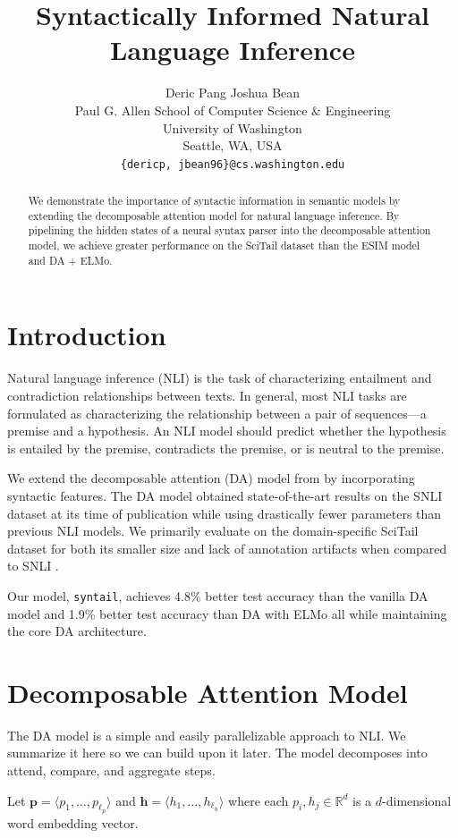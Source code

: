 \documentclass[11pt,a4paper]{article}
\title{Syntactically Informed Natural Language Inference}
\author{
  Deric Pang \quad
  Joshua Bean \\
  Paul G. Allen School of Computer Science \& Engineering \\
  University of Washington \\
  Seattle, WA, USA \\
  {\tt \{dericp, jbean96\}@cs.washington.edu} \\
}
\date{}
\begin{document}
\maketitle
\begin{abstract}
We demonstrate the importance of syntactic information in semantic models by extending the
decomposable attention model for natural language inference.
By pipelining the hidden states of a neural syntax parser into the decomposable
attention model, we achieve greater performance on the SciTail dataset
than the ESIM model and DA + ELMo.
\end{abstract}

\section{Introduction}

Natural language inference (NLI) is the task of characterizing entailment and
contradiction relationships between texts.
In general, most NLI tasks are formulated as characterizing the relationship
between a pair of sequences---a premise and a hypothesis. An NLI model should
predict whether the hypothesis is entailed by the premise, contradicts the
premise, or is neutral to the premise.

We extend the decomposable attention (DA) model from  \citet{Parikh2016-em} by
incorporating syntactic features.
The DA model obtained state-of-the-art results on the
SNLI \citep{Bowman2015-is} dataset at its time of publication while using
drastically fewer parameters than previous NLI models.
We primarily
evaluate on the domain-specific SciTail dataset \citep{Khot2018-th}
for both its smaller size and lack of annotation artifacts when compared to SNLI
\citep{Gururangan2018-lj}.

Our model, \texttt{syntail}, achieves 4.8\% better 
test accuracy than the vanilla
DA model and 1.9\% better test accuracy than DA with ELMo \citep{Peters2018-fz}
all while maintaining the core DA architecture.

\section{Decomposable Attention Model}

The DA model is a simple and easily parallelizable approach to NLI.
We summarize it here so we can build upon it later.
The model
decomposes into attend, compare, and aggregate steps.

Let
$\bm{p} = \langle p_1, \dots, p_{\ell_p} \rangle$ and
$\bm{h} = \langle h_1, \dots, h_{\ell_h} \rangle$ where each $p_i, h_j \in \mathbb{R}^d$
is a $d$-dimensional word embedding vector.
\end{document}
